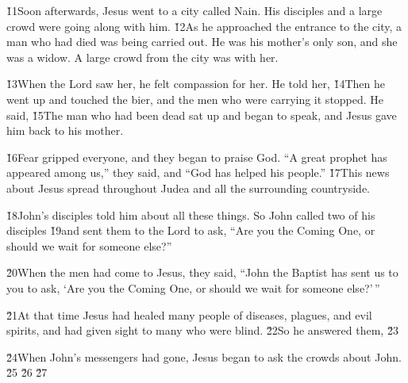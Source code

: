 \v{11}Soon afterwards, Jesus went to a city called Nain. His disciples and a large crowd were going along with him. \v{12}As he approached the entrance to the city, a man who had died was being carried out. He was his mother's only son, and she was a widow. A large crowd from the city was with her.

\v{13}When the Lord saw her, he felt compassion for her. He told her,  \v{14}Then he went up and touched the bier, and the men who were carrying it stopped. He said,  \v{15}The man who had been dead sat up and began to speak, and Jesus gave him back to his mother.

\v{16}Fear gripped everyone, and they began to praise God. ``A great prophet has appeared among us,'' they said, and ``God has helped his people.'' \v{17}This news about Jesus spread throughout Judea and all the surrounding countryside.

\v{18}John's disciples told him about all these things. So John called two of his disciples \v{19}and sent them to the Lord to ask, ``Are you the Coming One, or should we wait for someone else?''

\v{20}When the men had come to Jesus, they said, ``John the Baptist has sent us to you to ask, `Are you the Coming One, or should we wait for someone else?'\,''

\v{21}At that time Jesus had healed many people of diseases, plagues, and evil spirits, and had given sight to many who were blind. \v{22}So he answered them,  \v{23}

\v{24}When John's messengers had gone, Jesus began to ask the crowds about John.  \v{25} \v{26} \v{27} 

